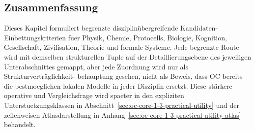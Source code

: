 \subsection*{Zusammenfassung}

Dieses Kapitel formuliert begrenzte disziplinübergreifende Kandidaten-
Einbettungskriterien fuer Physik, Chemie, Protocells, Biologie, Kognition,
Gesellschaft, Zivilisation, Theorie und formale Systeme. Jede begrenzte Route
wird mit demselben strukturellen Tuple auf der Detaillierungsebene des jeweiligen
Unterabschnittes gemappt, aber jede Zuordnung wird nur als Strukturverträglichkeit-
behauptung gesehen, nicht als Beweis, dass OC bereits die bestmoeglichen lokalen
Modelle in jeder Disziplin ersetzt. Diese stärkere operative und Vergleichsfrage
wird spaeter in den expliziten Unterstuetzungsklassen in
Abschnitt~\ref{sec:oc-core-1-3-practical-utility} und der zeilenweisen
Atlasdarstellung in
Anhang~\ref{sec:oc-core-1-3-practical-utility-atlas} behandelt.


